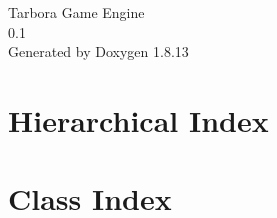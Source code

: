 \documentclass[twoside]{book}
\newcommand{\+}{\discretionary{\mbox{\scriptsize$\hookleftarrow$}}{}{}}
\newcommand{\clearemptydoublepage}{%
  \newpage{\pagestyle{empty}\cleardoublepage}%
}
\begin{document}
\hypersetup{pageanchor=false,
             bookmarksnumbered=true,
             pdfencoding=unicode
            }
\begin{titlepage}
\vspace*{7cm}
\begin{center}%
{\Large Tarbora Game Engine \\[1ex]\large 0.\+1 }\\
\vspace*{1cm}
{\large Generated by Doxygen 1.8.13}\\
\end{center}
\end{titlepage}
\clearemptydoublepage
{}
\tableofcontents
\clearemptydoublepage
{}
\hypersetup{pageanchor=true}

\chapter{Hierarchical Index}

\chapter{Class Index}

\end{document}
